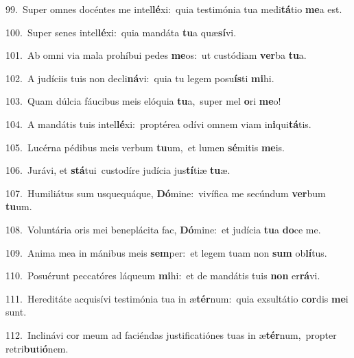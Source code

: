 {\numbfont\textcolor{\numbcolor}{99.}}~Super omnes docéntes me intel\-\textbf{lé}\-xi:~\star quia testimónia tua medi\-\textbf{tá}\-tio \textbf{me}\-a est.\par
{\numbfont\textcolor{\numbcolor}{100.}}~Super senes intel\-\textbf{lé}\-xi:~\star quia mandáta \textbf{tu}\-a quæ\-\textbf{sí}\-vi.\par
{\numbfont\textcolor{\numbcolor}{101.}}~Ab omni via mala prohíbui pedes \textbf{me}\-os:~\star ut custódiam \textbf{ver}\-ba \textbf{tu}\-a.\par
{\numbfont\textcolor{\numbcolor}{102.}}~A judíciis tuis non decli\-\textbf{ná}\-vi:~\star quia tu legem posu\-\textbf{ís}\-ti \textbf{mi}\-hi.\par
{\numbfont\textcolor{\numbcolor}{103.}}~Quam dúlcia fáucibus meis elóquia \textbf{tu}\-a,~\star super mel \textbf{o}\-ri \textbf{me}\-o!\par
{\numbfont\textcolor{\numbcolor}{104.}}~A mandátis tuis intel\-\textbf{lé}\-xi:~\star proptérea odívi omnem viam in\-\textbf{i}\-qui\-\textbf{tá}\-tis.\par
{\numbfont\textcolor{\numbcolor}{105.}}~Lucérna pédibus meis verbum \textbf{tu}\-um,~\star et lumen \textbf{sé}\-mitis \textbf{me}\-is.\par
{\numbfont\textcolor{\numbcolor}{106.}}~Jurávi, et \textbf{stá}\-tui~\star custodíre judícia jus\-\textbf{tí}\-tiæ \textbf{tu}\-æ.\par
{\numbfont\textcolor{\numbcolor}{107.}}~Humiliátus sum usquequáque, \textbf{Dó}\-mine:~\star vivífica me secúndum \textbf{ver}\-bum \textbf{tu}\-um.\par
{\numbfont\textcolor{\numbcolor}{108.}}~Voluntária oris mei beneplácita fac, \textbf{Dó}\-mine:~\star et judícia \textbf{tu}\-a \textbf{do}\-ce me.\par
{\numbfont\textcolor{\numbcolor}{109.}}~Anima mea in mánibus meis \textbf{sem}\-per:~\star et legem tuam non \textbf{sum} ob\-\textbf{lí}\-tus.\par
{\numbfont\textcolor{\numbcolor}{110.}}~Posuérunt peccatóres láqueum \textbf{mi}\-hi:~\star et de mandátis tuis \textbf{non} er\-\textbf{rá}\-vi.\par
{\numbfont\textcolor{\numbcolor}{111.}}~Hereditáte acquisívi testimónia tua in æ\-\textbf{tér}\-num:~\star quia exsultátio \textbf{cor}\-dis \textbf{me}\-i sunt.\par
{\numbfont\textcolor{\numbcolor}{112.}}~Inclinávi cor meum ad faciéndas justificatiónes tuas in æ\-\textbf{tér}\-num,~\star propter retri\-\textbf{bu}\-ti\-\textbf{ó}\-nem.\par
